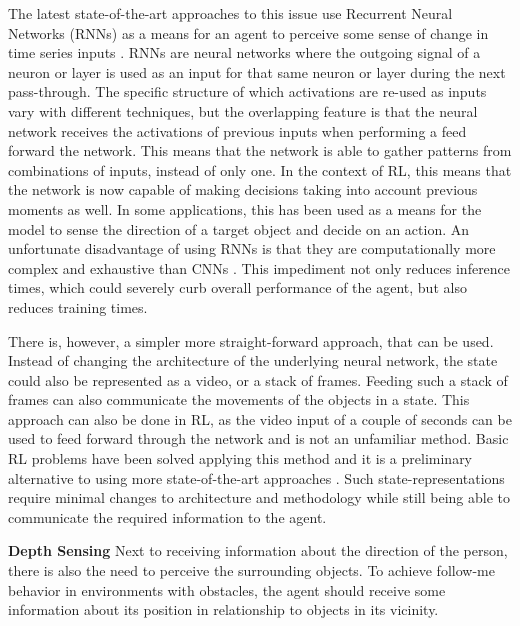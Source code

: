 The latest state-of-the-art approaches to this issue use Recurrent Neural Networks (RNNs) 
as a means for an agent 
to perceive some sense of change in time series inputs \cite{RLenLSTMfordrone, LSTMinRL}. 
RNNs are neural networks where the outgoing signal of a neuron or layer is used as an input for 
that same neuron or layer during the next pass-through. 
The specific structure of which activations are re-used as inputs vary with different techniques, 
but the overlapping feature is that the neural network receives the activations of previous 
inputs when performing a feed forward the network. This means that the 
network is able to gather patterns from combinations of inputs, instead of only one. 
In the context of RL, this means that the network is now capable of making decisions 
taking into account previous moments as well. In some applications, this has been used 
as a means for the model 
to sense the direction of a target object and decide on an action. 
An unfortunate disadvantage of using RNNs is that they are computationally more complex
and exhaustive than CNNs \cite{comparisonofarchitectures}. This impediment not only reduces 
inference times, which could severely curb overall performance of the agent, but also reduces 
training times. 

There is, however, a simpler more straight-forward approach, 
that can be used. Instead of changing the architecture of the underlying neural network, 
the state could also be represented as a video, or a stack of frames. Feeding such a stack 
of frames can also communicate the movements of the objects 
in a state. This approach can also be done in RL, as the video input of a couple 
of seconds can be used to feed forward through the network and is not an unfamiliar
method. Basic RL problems have been solved applying this method \cite{rlsolvingatari} and 
it is a preliminary alternative to using more 
state-of-the-art approaches \cite{DepthAndStackResearch}. Such state-representations 
require minimal changes to architecture and methodology while still being able to communicate 
the required information to the agent. \newline
 
\noindent
\textbf{Depth Sensing} \newline 
Next to receiving information about the direction of the person, there is also the need to 
perceive the surrounding objects. To achieve follow-me behavior in environments with obstacles, 
the agent should receive some information about its position in relationship to objects in its 
vicinity. 

